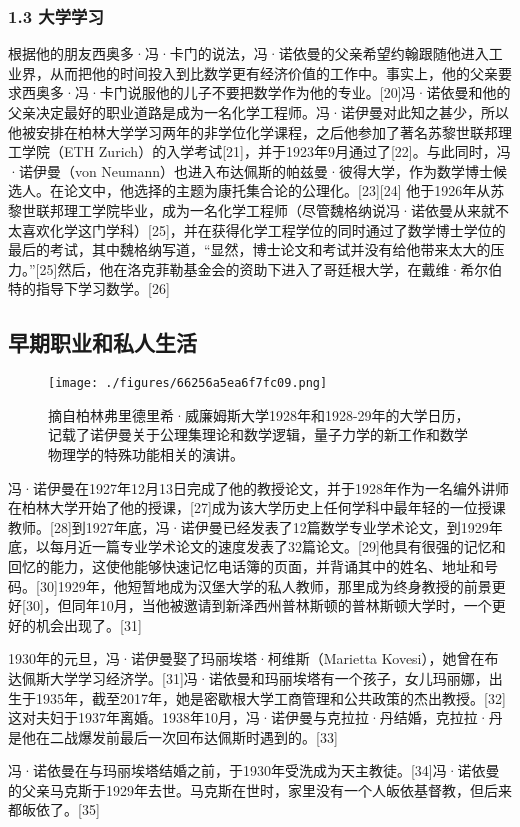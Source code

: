 \subsubsection{1.3 大学学习}
根据他的朋友西奥多·冯·卡门的说法，冯·诺依曼的父亲希望约翰跟随他进入工业界，从而把他的时间投入到比数学更有经济价值的工作中。事实上，他的父亲要求西奥多·冯·卡门说服他的儿子不要把数学作为他的专业。[20]冯·诺依曼和他的父亲决定最好的职业道路是成为一名化学工程师。冯·诺伊曼对此知之甚少，所以他被安排在柏林大学学习两年的非学位化学课程，之后他参加了著名苏黎世联邦理工学院（ETH Zurich）的入学考试[21]，并于1923年9月通过了[22]。与此同时，冯·诺伊曼（von Neumann）也进入布达佩斯的帕兹曼·彼得大学，作为数学博士候选人。在论文中，他选择的主题为康托集合论的公理化。[23][24] 他于1926年从苏黎世联邦理工学院毕业，成为一名化学工程师（尽管魏格纳说冯·诺依曼从来就不太喜欢化学这门学科）[25]，并在获得化学工程学位的同时通过了数学博士学位的最后的考试，其中魏格纳写道，“显然，博士论文和考试并没有给他带来太大的压力。”[25]然后，他在洛克菲勒基金会的资助下进入了哥廷根大学，在戴维·希尔伯特的指导下学习数学。[26]

\subsection{早期职业和私人生活}
\begin{figure}[ht]
\centering
\texttt{[image: ./figures/66256a5ea6f7fc09.png]}
\caption{摘自柏林弗里德里希·威廉姆斯大学1928年和1928-29年的大学日历，记载了诺伊曼关于公理集理论和数学逻辑，量子力学的新工作和数学物理学的特殊功能相关的演讲。} \label{fig_von_3}
\end{figure}
冯·诺伊曼在1927年12月13日完成了他的教授论文，并于1928年作为一名编外讲师在柏林大学开始了他的授课，[27]成为该大学历史上任何学科中最年轻的一位授课教师。[28]到1927年底，冯·诺伊曼已经发表了12篇数学专业学术论文，到1929年底，以每月近一篇专业学术论文的速度发表了32篇论文。[29]他具有很强的记忆和回忆的能力，这使他能够快速记忆电话簿的页面，并背诵其中的姓名、地址和号码。[30]1929年，他短暂地成为汉堡大学的私人教师，那里成为终身教授的前景更好[30]，但同年10月，当他被邀请到新泽西州普林斯顿的普林斯顿大学时，一个更好的机会出现了。[31]

1930年的元旦，冯·诺伊曼娶了玛丽埃塔·柯维斯（Marietta Kovesi），她曾在布达佩斯大学学习经济学。[31]冯·诺依曼和玛丽埃塔有一个孩子，女儿玛丽娜，出生于1935年，截至2017年，她是密歇根大学工商管理和公共政策的杰出教授。[32]这对夫妇于1937年离婚。1938年10月，冯·诺伊曼与克拉拉·丹结婚，克拉拉·丹是他在二战爆发前最后一次回布达佩斯时遇到的。[33]

冯·诺依曼在与玛丽埃塔结婚之前，于1930年受洗成为天主教徒。[34]冯·诺依曼的父亲马克斯于1929年去世。马克斯在世时，家里没有一个人皈依基督教，但后来都皈依了。[35]

